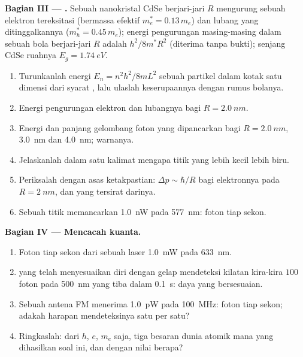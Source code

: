 \begin{problem}
\medskip
\noindent\textbf{Bagian III --- .}
Sebuah nanokristal CdSe berjari-jari $R$ mengurung sebuah elektron tereksitasi
(bermassa efektif $m_e^\ast = 0.13\,m_e$) dan lubang yang ditinggalkannya
($m_h^\ast = 0.45\,m_e$); energi pengurungan masing-masing dalam sebuah bola
berjari-jari $R$ adalah $h^2/8m^\ast R^2$ (diterima tanpa bukti); senjang CdSe ruahnya
$E_g = \qty{1.74}{eV}$.
\begin{enumerate}[resume]
  \item Turunkanlah energi $E_n = n^2h^2/8mL^2$ sebuah partikel dalam
        kotak satu dimensi dari syarat , lalu
        ulaslah keserupaannya dengan rumus bolanya.
  \item Energi pengurungan elektron dan lubangnya bagi
        $R = \qty{2.0}{nm}$.
  \item Energi dan panjang gelombang foton yang dipancarkan bagi $R = \qty{2.0}{nm}$,
        \qty{3.0}{nm} dan \qty{4.0}{nm}; warnanya.
  \item Jelaskanlah dalam satu kalimat mengapa titik yang lebih kecil lebih biru.
  \item Periksalah  dengan asas ketakpastian:
        $\Delta p \sim \hbar/R$ bagi elektronnya pada $R = \qty{2}{nm}$, dan
         yang tersirat darinya.
  \item Sebuah titik memancarkan \qty{1.0}{nW} pada \qty{577}{nm}: foton tiap sekon.
\end{enumerate}

\medskip
\noindent\textbf{Bagian IV --- Mencacah kuanta.}
\begin{enumerate}[resume]
  \item Foton tiap sekon dari sebuah laser \qty{1.0}{mW} pada \qty{633}{nm}.
  \item {} yang telah menyesuaikan diri dengan gelap mendeteksi kilatan kira-kira $100$ foton pada
        \qty{500}{nm} yang tiba dalam \qty{0.1}{s}: daya yang bersesuaian.
  \item Sebuah antena FM menerima \qty{1.0}{pW} pada \qty{100}{MHz}: foton tiap
        sekon; adakah harapan mendeteksinya satu per satu?
  \item Ringkaslah: dari $h$, $e$, $m_e$ saja, tiga besaran dunia
        atomik mana yang dihasilkan soal ini, dan dengan
        nilai berapa?
\end{enumerate}
\end{problem}
